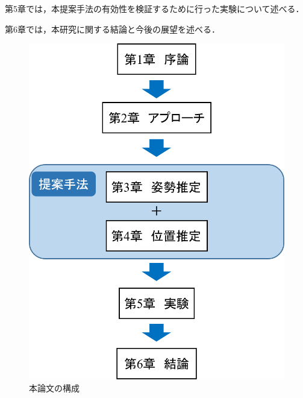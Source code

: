 第5章では，本提案手法の有効性を検証するために行った実験について述べる．

第6章では，本研究に関する結論と今後の展望を述べる．

\begin{figure}[b]
 \begin{center}
 \includegraphics[width=0.50\columnwidth]{./chap1/fig/structure.png}
 \caption{本論文の構成}
 \label{fig:structure}
 \end{center}
\end{figure}

\clearpage
